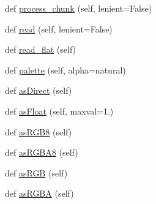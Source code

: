 \begin{DoxyCompactItemize}
\item 
def \hyperlink{class_python_01_g_u_i_1_1lib_1_1png_1_1_reader_aea5628481337f39025300c679a21502f}{process\+\_\+chunk} (self, lenient=False)
\item 
def \hyperlink{class_python_01_g_u_i_1_1lib_1_1png_1_1_reader_ac8def3e2a70eb8e229973086d39bd60a}{read} (self, lenient=False)
\item 
def \hyperlink{class_python_01_g_u_i_1_1lib_1_1png_1_1_reader_a6fc020ac3f8fda8df4d3bd6d9eb829f2}{read\+\_\+flat} (self)
\item 
def \hyperlink{class_python_01_g_u_i_1_1lib_1_1png_1_1_reader_a86dbd097935e19f48465cee11a5cdd8b}{palette} (self, alpha=\textquotesingle{}natural\textquotesingle{})
\item 
def \hyperlink{class_python_01_g_u_i_1_1lib_1_1png_1_1_reader_a9854b6edd68ba190d24f229422832841}{as\+Direct} (self)
\item 
def \hyperlink{class_python_01_g_u_i_1_1lib_1_1png_1_1_reader_a8a479ccbda892521dae914d293da0b5c}{as\+Float} (self, maxval=1.)
\item 
def \hyperlink{class_python_01_g_u_i_1_1lib_1_1png_1_1_reader_ad89140dcc1c0170a52ad217db984410d}{as\+R\+G\+B8} (self)
\item 
def \hyperlink{class_python_01_g_u_i_1_1lib_1_1png_1_1_reader_ae97eb1af3aaa07e44533d940d99f5711}{as\+R\+G\+B\+A8} (self)
\item 
def \hyperlink{class_python_01_g_u_i_1_1lib_1_1png_1_1_reader_a2323fcf6ed535c7cac5decdd1a6c3045}{as\+R\+GB} (self)
\item 
def \hyperlink{class_python_01_g_u_i_1_1lib_1_1png_1_1_reader_a36f25debee916a65db83796ceee97d82}{as\+R\+G\+BA} (self)
\end{DoxyCompactItemize}
